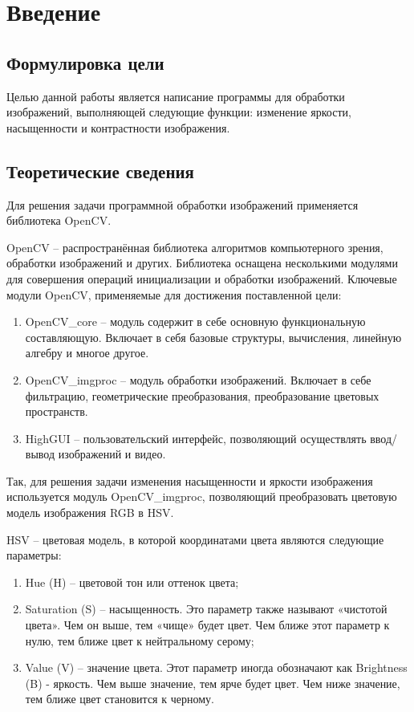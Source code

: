 \documentclass[12pt,a4paper]{scrartcl}
\begin{document}
\section{Введение}
\label{sec:intro}


\subsection{Формулировка цели}
Целью данной работы является написание программы для обработки изображений, выполняющей следующие функции: изменение яркости, насыщенности и контрастности изображения.

\subsection{Теоретические сведения}

Для решения задачи программной обработки изображений применяется библиотека OpenCV.

OpenCV – распространённая библиотека алгоритмов компьютерного зрения, обработки изображений и других. Библиотека оснащена несколькими модулями для совершения операций инициализации и обработки изображений. Ключевые модули OpenCV, применяемые для достижения поставленной цели:

    \begin{enumerate}
        \item OpenCV\_core – модуль содержит в себе основную функциональную составляющую. Включает в себя базовые структуры, вычисления, линейную алгебру и многое другое. 
        \item OpenCV\_imgproc – модуль обработки изображений. Включает в себе фильтрацию, геометрические преобразования, преобразование цветовых пространств.
        \item HighGUI – пользовательский интерфейс, позволяющий осуществлять ввод/вывод изображений и видео.
    \end{enumerate}
    \noindent 

Так, для решения задачи изменения насыщенности и яркости изображения используется модуль OpenCV\_imgproc, позволяющий преобразовать цветовую модель изображения RGB в HSV.  

HSV – цветовая модель, в которой координатами цвета являются следующие параметры:

    \begin{enumerate}
        \item Hue (H) – цветовой тон или оттенок цвета;
        \item Saturation (S) – насыщенность. Это параметр также называют «чистотой цвета». Чем он выше, тем «чище» будет цвет. Чем ближе этот параметр к нулю, тем ближе цвет к нейтральному серому;
        \item Value (V) – значение цвета. Этот параметр иногда обозначают как Brightness (B) - яркость. Чем выше значение, тем ярче будет цвет. Чем ниже значение, тем ближе цвет становится к черному. 
    \end{enumerate}
    \noindent 
\end{document}
